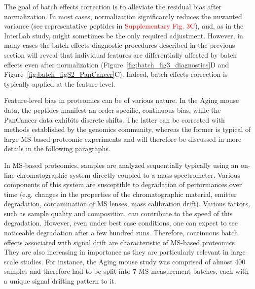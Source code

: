 \documentclass[num-refs]{wiley-article}
\begin{document}
The goal of batch effects correction is to alleviate the residual bias after normalization. In most cases, normalization significantly reduces the unwanted variance (see representative peptides in \textcolor{red}{Supplementary Fig. 3C}), and, as in the InterLab study, might sometimes be the only required adjustment. However, in many cases the batch effects diagnostic procedures described in the previous section will reveal that individual features are differentially affected by batch effects even after normalization (Figure~\ref{fig:batch_fig3_diagnostics}D and Figure~\ref{fig:batch_figS2_PanCancer}C). Indeed, batch effects correction is typically applied at the feature-level.

Feature-level bias in proteomics can be of various nature. In the Aging mouse data, the peptides manifest an order-specific, continuous bias, while the PanCancer data exhibits discrete shifts. The latter can be corrected with methods established by the genomics community, whereas the former is typical of large MS-based proteomic experiments and will therefore be discussed in more details in the following paragraphs.

In MS-based proteomics, samples are analyzed sequentially typically using an on-line chromatographic system directly coupled to a mass spectrometer. Various components of this system are susceptible to degradation of performances over time (e.g. changes in the properties of the chromatographic material, emitter degradation, contamination of MS lenses, mass calibration drift). Various factors, such as sample quality and composition, can contribute to the speed of this degradation. However, even under best case conditions, one can expect to see noticeable degradation after a few hundred runs. Therefore, continuous batch effects associated with signal drift are characteristic of MS-based proteomics. They are also increasing in importance as they are particularly relevant in large scale studies. For instance, the Aging mouse study was comprised of almost 400 samples and therefore had to be split into 7 MS measurement batches, each with a unique signal drifting pattern to it.
\end{document}
